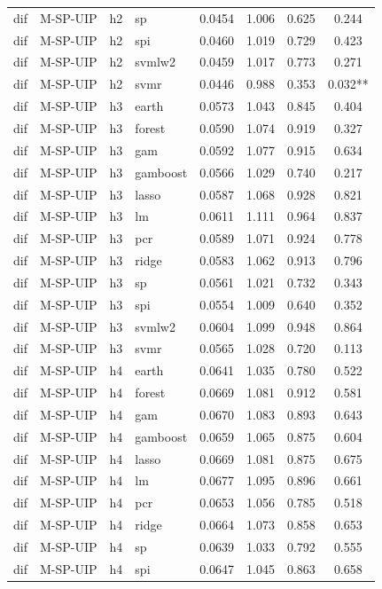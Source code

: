 \begin{ThreePartTable}
\begin{longtable}[t]{llclcccc}
dif & M-SP-UIP & h2 & sp & 0.0454 & 1.006 & 0.625 & 0.244\\
dif & M-SP-UIP & h2 & spi & 0.0460 & 1.019 & 0.729 & 0.423\\
dif & M-SP-UIP & h2 & svmlw2 & 0.0459 & 1.017 & 0.773 & 0.271\\
dif & M-SP-UIP & h2 & svmr & 0.0446 & 0.988 & 0.353 & 0.032**\\
\addlinespace
dif & M-SP-UIP & h3 & earth & 0.0573 & 1.043 & 0.845 & 0.404\\
dif & M-SP-UIP & h3 & forest & 0.0590 & 1.074 & 0.919 & 0.327\\
dif & M-SP-UIP & h3 & gam & 0.0592 & 1.077 & 0.915 & 0.634\\
dif & M-SP-UIP & h3 & gamboost & 0.0566 & 1.029 & 0.740 & 0.217\\
dif & M-SP-UIP & h3 & lasso & 0.0587 & 1.068 & 0.928 & 0.821\\
dif & M-SP-UIP & h3 & lm & 0.0611 & 1.111 & 0.964 & 0.837\\
dif & M-SP-UIP & h3 & pcr & 0.0589 & 1.071 & 0.924 & 0.778\\
dif & M-SP-UIP & h3 & ridge & 0.0583 & 1.062 & 0.913 & 0.796\\
dif & M-SP-UIP & h3 & sp & 0.0561 & 1.021 & 0.732 & 0.343\\
dif & M-SP-UIP & h3 & spi & 0.0554 & 1.009 & 0.640 & 0.352\\
dif & M-SP-UIP & h3 & svmlw2 & 0.0604 & 1.099 & 0.948 & 0.864\\
dif & M-SP-UIP & h3 & svmr & 0.0565 & 1.028 & 0.720 & 0.113\\
\addlinespace
dif & M-SP-UIP & h4 & earth & 0.0641 & 1.035 & 0.780 & 0.522\\
dif & M-SP-UIP & h4 & forest & 0.0669 & 1.081 & 0.912 & 0.581\\
dif & M-SP-UIP & h4 & gam & 0.0670 & 1.083 & 0.893 & 0.643\\
dif & M-SP-UIP & h4 & gamboost & 0.0659 & 1.065 & 0.875 & 0.604\\
dif & M-SP-UIP & h4 & lasso & 0.0669 & 1.081 & 0.875 & 0.675\\
dif & M-SP-UIP & h4 & lm & 0.0677 & 1.095 & 0.896 & 0.661\\
dif & M-SP-UIP & h4 & pcr & 0.0653 & 1.056 & 0.785 & 0.518\\
dif & M-SP-UIP & h4 & ridge & 0.0664 & 1.073 & 0.858 & 0.653\\
dif & M-SP-UIP & h4 & sp & 0.0639 & 1.033 & 0.792 & 0.555\\
dif & M-SP-UIP & h4 & spi & 0.0647 & 1.045 & 0.863 & 0.658\\

\end{longtable}
\end{ThreePartTable}
